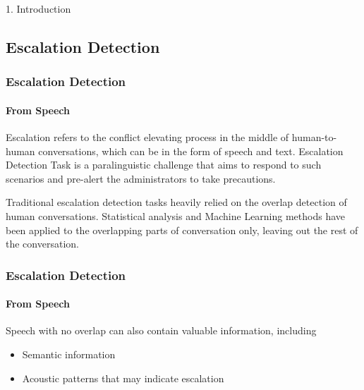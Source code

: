 \documentclass[
	11pt, %
]{beamer}
\begin{document}
\begin{frame}

\begin{center}
    \Huge 1. Introduction
\end{center}
    
\end{frame}


\subsection{Escalation Detection}

\begin{frame}
	\frametitle{Escalation Detection}
	\framesubtitle{From Speech}
	
	\alert{Escalation} refers to the conflict elevating process in the middle of human-to-human conversations, which can be in the form of speech and text. Escalation Detection Task is a \alert{paralinguistic challenge} that aims to respond to such scenarios and pre-alert the administrators to take precautions.
	
	\bigskip
	
	Traditional escalation detection tasks heavily relied on the \alert{overlap detection} of human conversations. Statistical analysis and Machine Learning methods have been applied to the overlapping parts of conversation only, leaving out the rest of the conversation.
	

\end{frame}


\begin{frame}

\frametitle{Escalation Detection}
\framesubtitle{From Speech}

	Speech with no overlap can also contain valuable information, including
	\begin{itemize}
	    \item Semantic information
	    \item Acoustic patterns that may indicate escalation
	\end{itemize}
	\bigskip
	

\end{frame}

\end{document}
